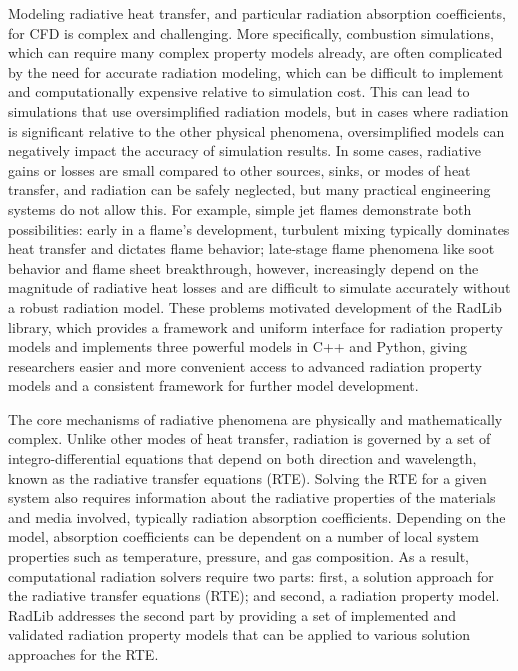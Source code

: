 \documentclass[preprint,12pt, a4paper]{elsarticle}
\begin{document}
Modeling radiative heat transfer, and particular radiation absorption coefficients, for CFD is complex and challenging. More specifically, combustion simulations, which can require many complex property models already, are often complicated by the need for accurate radiation modeling, which can be difficult to implement and computationally expensive relative to simulation cost. This can lead to simulations that use oversimplified radiation models, but in cases where radiation is significant relative to the other physical phenomena, oversimplified models can negatively impact the accuracy of simulation results. In some cases, radiative gains or losses are small compared to other sources, sinks, or modes of heat transfer, and radiation can be safely neglected, but many practical engineering systems do not allow this. For example, simple jet flames demonstrate both possibilities: early in a flame's development, turbulent mixing typically dominates heat transfer and dictates flame behavior; late-stage flame phenomena like soot behavior and flame sheet breakthrough, however, increasingly depend on the magnitude of radiative heat losses and are difficult to simulate accurately without a robust radiation model. These problems motivated development of the RadLib library, which provides a framework and uniform interface for radiation property models and implements three powerful models in C++ and Python, giving researchers easier and more convenient access to advanced radiation property models and a consistent framework for further model development. 

The core mechanisms of radiative phenomena are physically and mathematically complex. Unlike other modes of heat transfer, radiation is governed by a set of integro-differential equations that depend on both direction and wavelength, known as the radiative transfer equations (RTE). Solving the RTE for a given system also requires information about the radiative properties of the materials and media involved, typically radiation absorption coefficients. Depending on the model, absorption coefficients can be dependent on a number of local system properties such as temperature, pressure, and gas composition. As a result, computational radiation solvers require two parts: first, a solution approach for the radiative transfer equations (RTE); and second, a radiation property model. RadLib addresses the second part by providing a set of implemented and validated radiation property models that can be applied to various solution approaches for the RTE. 
\end{document}

